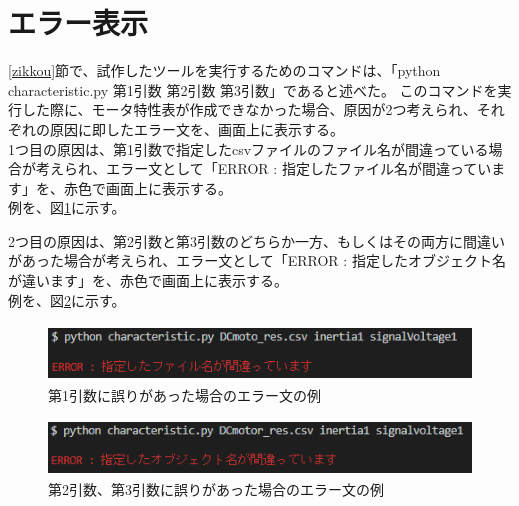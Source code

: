 \section{エラー表示}\label{error}
\ref{zikkou}節で、試作したツールを実行するためのコマンドは、「python characteristic.py 第1引数 第2引数 第3引数」であると述べた。
このコマンドを実行した際に、モータ特性表が作成できなかった場合、原因が2つ考えられ、それぞれの原因に即したエラー文を、画面上に表示する。\\
1つ目の原因は、第1引数で指定したcsvファイルのファイル名が間違っている場合が考えられ、エラー文として「ERROR : 指定したファイル名が間違っています」を、赤色で画面上に表示する。\\
例を、図\ref{fig:error_file}に示す。

2つ目の原因は、第2引数と第3引数のどちらか一方、もしくはその両方に間違いがあった場合が考えられ、エラー文として「ERROR : 指定したオブジェクト名が違います」を、赤色で画面上に表示する。\\
例を、図\ref{fig:error_comand}に示す。

\begin{figure}[t]
	\centering
	\includegraphics[width=12cm,height=1.5cm]{./Image/error_file.png}
	\caption{第1引数に誤りがあった場合のエラー文の例}
	\label{fig:error_file}
\end{figure}

\begin{figure}[t]
	\centering
	\includegraphics[width=12cm,height=1.5cm]{./Image/error_comand.png}
	\caption{第2引数、第3引数に誤りがあった場合のエラー文の例}
	\label{fig:error_comand}
\end{figure}